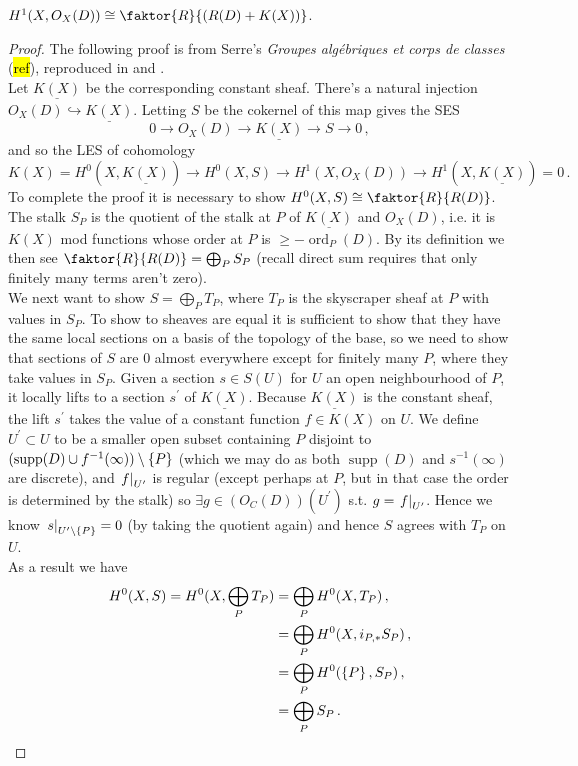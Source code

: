 \documentclass{article}
\begin{document}
\begin{prop}
	$H^1(X,O_X(D)) \cong \faktor{R}{(R(D) + K(X))}$. 
\end{prop}
\begin{proof}
	The following proof is from Serre's \textit{Groupes alg\'{e}briques et corps de classes} (\hl{ref}), reproduced in \cite{Vakil2000} and \cite{Belmans2014}. \\
	Let $\underline{K(X)}$ be the corresponding constant sheaf. There's a natural injection $O_X(D) \hookrightarrow \underline{K(X)}$. Letting $S$ be the cokernel of this map gives the SES
	\[
	0 \to O_X(D) \to \underline{K(X)} \to S \to 0 \, ,
	\]
	and so the LES of cohomology 
	\[
	K(X) = H^0(X,\underline{K(X)}) \to H^0(X,S) \to H^1(X,O_X(D)) \to H^1(X,\underline{K(X)}) =0 \, .
	\]
	To complete the proof it is necessary to show $H^0(X,S) \cong \faktor{R}{R(D)}$. The stalk $S_P$ is the quotient of the stalk at $P$ of $\underline{K(X)}$ and $O_X(D)$, i.e. it is $K(X)$ mod functions whose order at $P$ is $\geq - \operatorname{ord}_P(D)$. By its definition we then see $\faktor{R}{R(D)} = \bigoplus_P S_P$ (recall direct sum requires that only finitely many terms aren't zero).  \\
	We next want to show $S = \bigoplus_P T_P$, where $T_P$ is the skyscraper sheaf at $P$ with values in $S_P$. To show to sheaves are equal it is sufficient to show that they have the same local sections on a basis of the topology of the base, so we need to show that sections of $S$ are 0 almost everywhere except for finitely many $P$, where they take values in $S_P$. Given a section $s \in S(U)$ for $U$ an open neighbourhood of $P$, it locally lifts to a section $s^\prime$ of $\underline{K(X)}$. Because $\underline{K(X)}$ is the constant sheaf, the lift $s^\prime$ takes the value of a constant function $f \in K(X)$ on $U$. We define $U^\prime \subset U$ to be a smaller open subset containing $P$ disjoint to $(\operatorname{supp}(D) \cup f^{-1}(\infty)) \setminus \left\{ P \right\}$ (which we may do as both $\operatorname{supp}(D)$ and $s^{-1}(\infty)$ are discrete), and $\left. f \right\rvert_{U^\prime}$ is regular (except perhaps at $P$, but in that case the order is determined by the stalk) so  $\exists g \in (O_C(D))(U^\prime)$ s.t. $g = \left. f \right\rvert_{U^\prime}$. Hence we know $\left. s \right\rvert_{U^\prime \setminus \left\{ P \right\}}=0$ (by taking the quotient again) and hence $S$ agrees with $T_P$ on $U$. \\ 
	As a result we have 
	\begin{align*}
		H^0(X,S) = H^0(X,\bigoplus_P T_P) &= \bigoplus_P H^0(X,T_P) \, , \\
		&= \bigoplus_P H^0(X,i_{P,\ast} S_P) \, , \\
		&= \bigoplus_P H^0(\left\{ P \right\},S_P) \, , \\
		&= \bigoplus_P S_P \, .
	\end{align*}
\end{proof}
\end{document}

